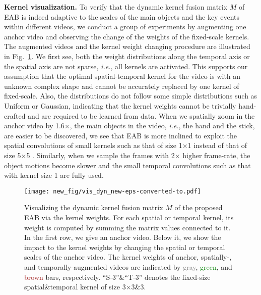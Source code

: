 \textbf{Kernel visualization.}
To verify that the dynamic kernel fusion matrix $M$ of EAB is indeed adaptive to the scales of the main objects and the key events within different videos, we conduct a group of experiments by augmenting one anchor video and observing the change of the weights of the fixed-scale kernels. The augmented videos and the kernel weight changing procedure are illustrated in Fig.~\ref{fig_m}. We first see, both the weight distributions along the temporal axis or the spatial axis are not sparse, \textit{i.e.}, all kernels are activated. This supports our assumption that the optimal spatial-temporal kernel for the video is with an unknown complex shape and cannot be accurately replaced by one kernel of fixed-scale. Also, the distributions do not follow some simple distributions such as Uniform or Gaussian, indicating that the kernel weights cannot be trivially hand-crafted and are required to be learned from data.
When we spatially zoom in the anchor video by 1.6$\times$, the main objects in the video, \textit{i.e.}, the hand and the stick, are easier to be discovered, we see that EAB is more inclined to exploit the spatial convolutions of small kernels such as that of size 1$\times$1 instead of that of size 5$\times$5
. Similarly, when we sample the frames with 2$\times$ higher frame-rate, the object motions become slower and the small temporal convolutions such as that with kernel size 1 are fully used.




\begin{figure}[!t]
	\centering
	\centerline{\texttt{[image: new\_fig/vis\_dyn\_new-eps-converted-to.pdf]}}
	\caption {Visualizing the dynamic kernel fusion matrix $M$ of the proposed EAB via the kernel weights. For each spatial or temporal kernel, its weight is computed by summing the matrix values connected to it.
		In the first row, we give an anchor video.
		Below it, we show the impact to the kernel weights by changing the spatial or temporal scales of the anchor video. The kernel weights of anchor, spatially-, and temporally-augmented videos are indicated by \textcolor{gray}{gray}, \textcolor{green}{green}, and \textcolor{brown}{brown} bars, respectively.
		``S-3''\&``T-3'' denotes the fixed-size spatial\&temporal kernel of size 3$\times$3\&3.
	}
	\label{fig_m}
\end{figure}




